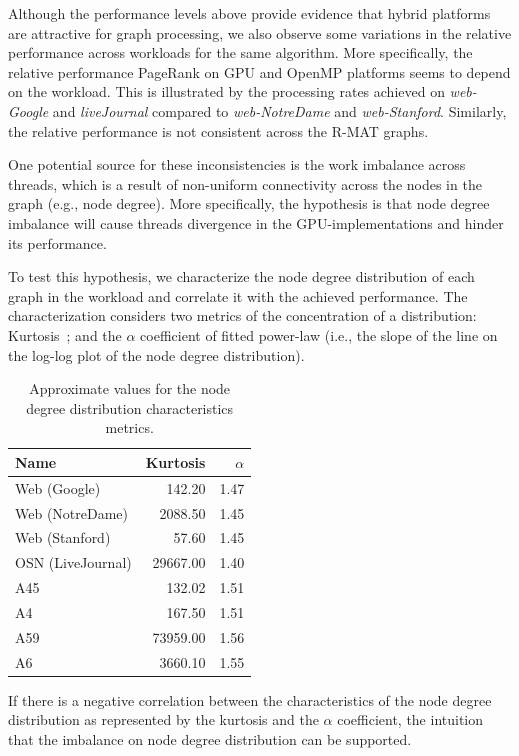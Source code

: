 Although the performance levels above provide evidence that hybrid platforms are attractive for graph processing, we also observe some variations in the relative performance across workloads for the same algorithm. More specifically, the relative performance PageRank on GPU and OpenMP platforms seems to depend on the workload. This is illustrated by the processing rates achieved on {\em web-Google} and {\em liveJournal} compared to {\em web-NotreDame} and {\em web-Stanford}. Similarly, the relative performance is not consistent across the R-MAT graphs. 

One potential source for these inconsistencies is the work imbalance across threads, which is a result of non-uniform connectivity across the nodes in the graph (e.g., node degree). More specifically, the hypothesis is that node degree imbalance will cause threads divergence in the GPU-implementations and hinder its performance. 

To test this hypothesis, we characterize the node degree distribution of each graph in the workload and correlate it with the achieved performance. The characterization considers two metrics of the concentration of a distribution: Kurtosis~\cite{refstats}; and the $\alpha$ coefficient of fitted power-law (i.e., the slope of the line on the log-log plot of the node degree distribution). 

\begin{table}[ht]
\centering
\begin{tabular}{l|r|r}
Name              & Kurtosis   & $\alpha$ \\\hline
Web (Google)      & 142.20   & 1.47    \\\hline
Web (NotreDame)   & 2088.50  & 1.45    \\\hline
Web (Stanford)    & 57.60    & 1.45    \\\hline
OSN (LiveJournal) & 29667.00 & 1.40    \\\hline
A45               & 132.02  & 1.51    \\\hline
A4                & 167.50   & 1.51    \\\hline
A59               & 73959.00 & 1.56    \\\hline
A6                & 3660.10  & 1.55     \\\hline
\end{tabular}
\caption{Approximate values for the node degree distribution characteristics metrics.}
\label{tab:kurtosis}
\end{table}
            
If there is a negative correlation between the characteristics of the node degree distribution as represented by the kurtosis and the $\alpha$ coefficient, the intuition that the imbalance on node degree distribution can be supported. 

